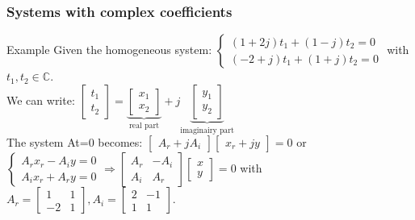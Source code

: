 \begin{frame}
	\frametitle{Systems with complex coefficients}
	\begin{block}{Example}
		Given the homogeneous system: $\begin{cases}
		(1+2j)t_1+(1-j)t_2=0\\
		(-2+j)t_1+(1+j)t_2=0 \end{cases}$ with $t_1,t_2\in\mathbb{C}$.\\
		We can write: $\begin{bmatrix}
		t_1\\t_2
		\end{bmatrix}=\underbrace{\begin{bmatrix}
		x_1\\x_2
		\end{bmatrix}}_\text{real part}+j\underbrace{\begin{bmatrix}y_1\\y_2\end{bmatrix}}_\text{imaginairy part}$\\
	The system At=0 becomes: $\begin{bmatrix}
	A_r+jA_i
	\end{bmatrix}\begin{bmatrix}
	x_r+jy
	\end{bmatrix}=0$ or $\begin{cases}A_rx_r-A_iy=0\\
	A_ix_r+A_ry=0 \end{cases} \Rightarrow \begin{bmatrix}
	A_r & -A_i\\
	A_i & A_r
	\end{bmatrix}\begin{bmatrix}
	x\\y
	\end{bmatrix}=0$ with $A_r=\begin{bmatrix}
	1 & 1\\
	-2 & 1
	\end{bmatrix}, A_i=\begin{bmatrix}
	2 & -1\\
	1 & 1
	\end{bmatrix}$.
	\end{block}
\end{frame}

